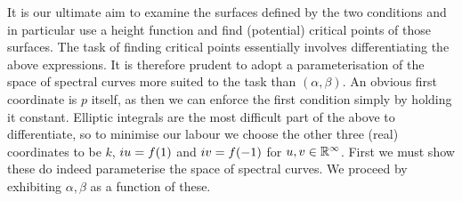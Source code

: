 It is our ultimate aim to examine the surfaces defined by the two conditions and in particular use a height function and find (potential) critical points of those surfaces. The task of finding critical points essentially involves differentiating the above expressions. It is therefore prudent to adopt a parameterisation of the space of spectral curves more suited to the task than $(α,β)$. An obvious first coordinate is $p$ itself, as then we can enforce the first condition simply by holding it constant. Elliptic integrals are the most difficult part of the above to differentiate, so to minimise our labour we choose the other three (real) coordinates to be $k$, $i u = f(1)$ and $i v = f(-1)$ for $u,v \in \mathbb{R}^\infty$. First we must show these do indeed parameterise the space of spectral curves. We proceed by exhibiting $α,β$ as a function of these.

